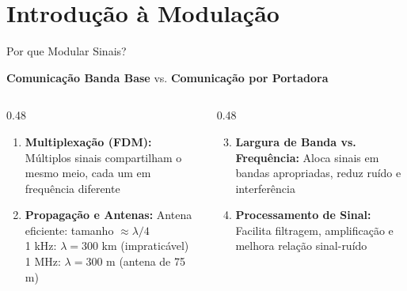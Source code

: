 
\section{Introdução à Modulação}

\begin{frame}{Por que Modular Sinais?}

\textbf{Comunicação Banda Base} vs. \textbf{Comunicação por Portadora}

\vspace{0.2cm}

\begin{columns}[T]
\begin{column}{0.48\textwidth}
\begin{enumerate}
\item \textbf{Multiplexação (FDM):}
   Múltiplos sinais compartilham o mesmo meio, cada um em frequência diferente

\item \textbf{Propagação e Antenas:}
   Antena eficiente: tamanho $\approx \lambda/4$\\
   1 kHz: $\lambda = 300$ km (impraticável)\\
   1 MHz: $\lambda = 300$ m (antena de 75 m)
\end{enumerate}
\end{column}
\begin{column}{0.48\textwidth}
\begin{enumerate}\setcounter{enumi}{2}
\item \textbf{Largura de Banda vs. Frequência:}
   Aloca sinais em bandas apropriadas, reduz ruído e interferência

\item \textbf{Processamento de Sinal:}
   Facilita filtragem, amplificação e melhora relação sinal-ruído
\end{enumerate}
\end{column}
\end{columns}

\end{frame}


